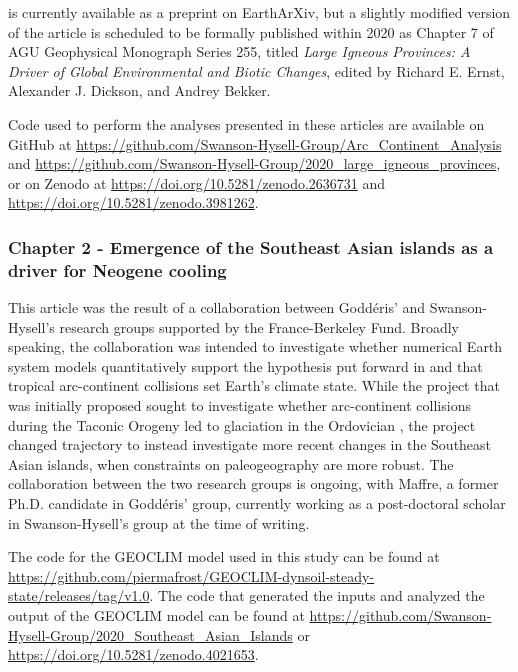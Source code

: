 \documentclass{ucbthesis}
\begin{document}
\begin{frontmatter}
\begin{preface}
\citet{Park2019a} is currently available as a preprint on EarthArXiv, but a slightly modified version of the article is scheduled to be formally published within 2020 as Chapter 7 of AGU Geophysical Monograph Series 255, titled \textit{Large Igneous Provinces: A Driver of Global Environmental and Biotic Changes}, edited by Richard E. Ernst, Alexander J. Dickson, and Andrey Bekker.

Code used to perform the analyses presented in these articles are available on GitHub at \url{https://github.com/Swanson-Hysell-Group/Arc_Continent_Analysis} and \url{https://github.com/Swanson-Hysell-Group/2020_large_igneous_provinces}, or on Zenodo at \url{https://doi.org/10.5281/zenodo.2636731} and \url{https://doi.org/10.5281/zenodo.3981262}.

\subsubsection*{Chapter 2 - Emergence of the Southeast Asian islands as a driver for Neogene cooling}

\noindent
{}

\bigskip

This article was the result of a collaboration between Godd\'eris' and Swanson-Hysell's research groups supported by the France-Berkeley Fund. Broadly speaking, the collaboration was intended to investigate whether numerical Earth system models quantitatively support the hypothesis put forward in \citet{Macdonald2019a} and \citet{Swanson-Hysell2017a} that tropical arc-continent collisions set Earth's climate state. While the project that was initially proposed sought to investigate whether arc-continent collisions during the Taconic Orogeny led to glaciation in the Ordovician \citep{Swanson-Hysell2017a}, the project changed trajectory to instead investigate more recent changes in the Southeast Asian islands, when constraints on paleogeography are more robust. The collaboration between the two research groups is ongoing, with Maffre, a former Ph.D. candidate in Godd\'eris' group, currently working as a post-doctoral scholar in Swanson-Hysell's group at the time of writing.

The code for the GEOCLIM model used in this study can be found at \url{https://github.com/piermafrost/GEOCLIM-dynsoil-steady-state/releases/tag/v1.0}. The code that generated the inputs and analyzed the output of the GEOCLIM model can be found at \url{https://github.com/Swanson-Hysell-Group/2020_Southeast_Asian_Islands} or \url{https://doi.org/10.5281/zenodo.4021653}.


\end{preface}
\end{frontmatter}
\end{document}

